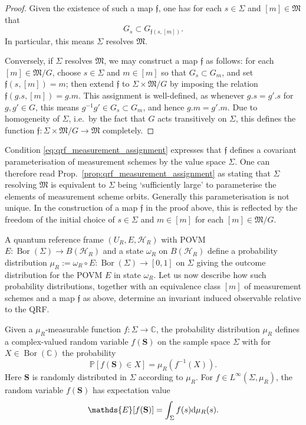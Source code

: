 \documentclass[sn-mathphys-num]{sn-jnl}%
\newcommand{\CC}{\mathbb{C}}
\newcommand{\HH}{\mathcal{H}}
\DeclareMathOperator{\Bor}{Bor}
\newcommand{\diff}{\textup{d}}
\numberwithin{equation}{section}
\theoremstyle{thmstyleone}%
\theoremstyle{thmstyletwo}%
\theoremstyle{thmstylethree}%
\begin{document}
\begin{proof} Given the existence of such a map $\mathfrak{f}$, one has for each $s\in\Sigma$ and $[m]\in\mathfrak{M}$ that
\begin{equation}
    G_s\subset G_{\mathfrak{f}(s,[m])}.
\end{equation}
In particular, this means $\Sigma$ resolves $\mathfrak{M}$. 

Conversely, if $\Sigma$ resolves $\mathfrak{M}$, we may construct a map $\mathfrak{f}$ as follows: for each $[m]\in\mathfrak{M}/G$, choose $s\in \Sigma$ and $m\in[m]$ so that $G_s\subset G_m$, and set $\mathfrak{f}(s,[m])=m$; then extend $\mathfrak{f}$ to $\Sigma\times \mathfrak{M}/G$ by imposing the relation $\mathfrak{f}(g.s,[m])=g.m$. This assignment is well-defined, as whenever $g.s=g'.s$ for $g,g'\in G$, this means $g^{-1}g'\in G_s\subset G_m$, and hence $g.m=g'.m$. Due to homogeneity of $\Sigma$, i.e.~by the fact that $G$ acts transitively on $\Sigma$, this defines the function $\mathfrak{f}:\Sigma\times \mathfrak{M}/G\to\mathfrak{M}$ completely.
\end{proof}
Condition \eqref{eq:qrf_measurement_assignment} expresses that $\mathfrak{f}$ defines a covariant parameterisation of measurement schemes by the value space $\Sigma$. One can therefore read Prop.~\ref{prop:qrf_measurement_assignment} as stating that $\Sigma$ resolving $\mathfrak{M}$ is equivalent to $\Sigma$ being `sufficiently large' to parameterise the elements of measurement scheme orbits. Generally this parameterisation is not unique. In the construction of a map $\mathfrak{f}$ in the proof above, this is reflected by the freedom of the initial choice of $s\in \Sigma$ and $m\in[m]$ for each $[m]\in\mathfrak{M}/G$.


A quantum reference frame $(U_R,E,\HH_R)$ with POVM $E:\Bor(\Sigma)\to B(\HH_R)$ and a state $\omega_R$ on $B(\HH_R)$ define a probability distribution $\mu_R:=\omega_R\circ E:\Bor(\Sigma)\to [0,1]$ on $\Sigma$ giving the outcome distribution for the POVM $E$ in state $\omega_R$. Let us now describe how such probability distributions, together with an equivalence class $[m]$ of measurement schemes and a map $\mathfrak{f}$ as above, determine an invariant induced observable relative to the QRF. 

Given a $\mu_R$-measurable function $f:\Sigma\to\CC$, the probability distribution $\mu_R$ defines a complex-valued random variable $f(\mathbf{S})$ on the sample space $\Sigma$ with for $X\in \Bor(\CC)$ the probability
\begin{equation}
    \mathds{P}[f(\mathbf{S})\in X]=\mu_R(f^{-1}(X)).
\end{equation}
Here $\mathbf{S}$ is randomly distributed in $\Sigma$ according to $\mu_R$. For $f\in L^\infty(\Sigma,\mu_R)$, the random variable $f(\mathbf{S})$ has expectation value
\begin{equation}
    \mathds{E}[f(\mathbf{S})]=\int_\Sigma f(s)\diff\mu_R(s).
\end{equation}
\end{document}
